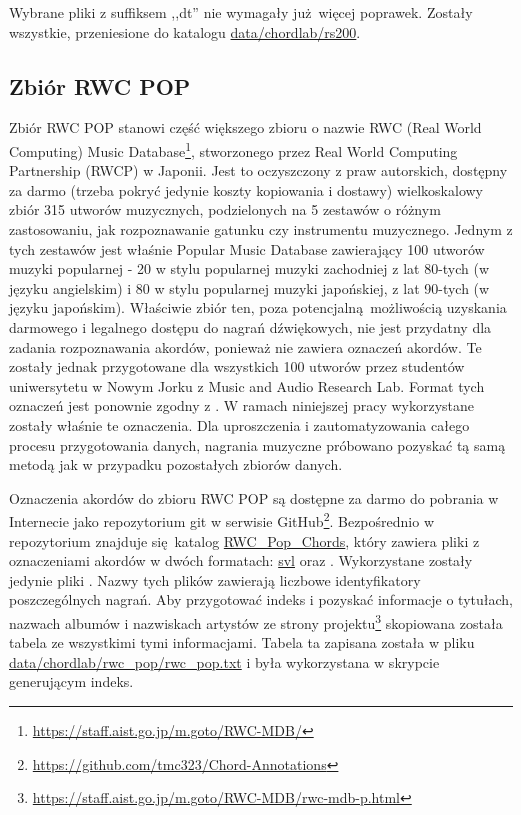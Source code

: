 Wybrane pliki z suffiksem ,,dt'' nie wymagały już więcej poprawek. Zostały wszystkie, przeniesione do katalogu \url{data/chordlab/rs200}.

\subsection{Zbiór RWC POP}

Zbiór RWC POP \cite{goto_rwc_nodate} stanowi część większego zbioru o nazwie RWC (Real World Computing) Music Database\footnote{\url{https://staff.aist.go.jp/m.goto/RWC-MDB/}}, stworzonego przez Real World Computing Partnership (RWCP) w Japonii. Jest to oczyszczony z praw autorskich, dostępny za darmo (trzeba pokryć jedynie koszty kopiowania i dostawy) wielkoskalowy zbiór 315 utworów muzycznych, podzielonych na 5 zestawów o różnym zastosowaniu, jak rozpoznawanie gatunku czy instrumentu muzycznego. Jednym z tych zestawów jest właśnie Popular Music Database zawierający 100 utworów muzyki popularnej - 20 w stylu popularnej muzyki zachodniej z lat 80-tych (w języku angielskim) i 80 w stylu popularnej muzyki japońskiej, z lat 90-tych (w języku japońskim). Właściwie zbiór ten, poza potencjalną możliwością uzyskania darmowego i legalnego dostępu do nagrań dźwiękowych, nie jest przydatny dla zadania rozpoznawania akordów, ponieważ nie zawiera oznaczeń akordów. Te zostały jednak przygotowane dla wszystkich 100 utworów przez studentów uniwersytetu w Nowym Jorku z Music and Audio Research Lab. Format tych oznaczeń jest ponownie zgodny z \cite{harte_towards_nodate}. W ramach niniejszej pracy wykorzystane zostały właśnie te oznaczenia.  Dla uproszczenia i zautomatyzowania całego procesu przygotowania danych, nagrania muzyczne próbowano pozyskać tą samą metodą jak w przypadku pozostałych zbiorów danych.

Oznaczenia akordów do zbioru RWC POP są dostępne za darmo do pobrania w Internecie jako repozytorium git w serwisie GitHub\footnote{\url{https://github.com/tmc323/Chord-Annotations}}. Bezpośrednio w repozytorium znajduje się katalog \url{RWC_Pop_Chords}, który zawiera pliki z oznaczeniami akordów w dwóch formatach: \url{svl} oraz . Wykorzystane zostały jedynie pliki . Nazwy tych plików zawierają liczbowe identyfikatory poszczególnych nagrań. Aby przygotować indeks i pozyskać informacje o tytułach, nazwach albumów i nazwiskach artystów ze strony projektu\footnote{\url{https://staff.aist.go.jp/m.goto/RWC-MDB/rwc-mdb-p.html}} skopiowana została tabela ze wszystkimi tymi informacjami. Tabela ta zapisana została w pliku \url{data/chordlab/rwc_pop/rwc_pop.txt} i była wykorzystana w skrypcie generującym indeks.

